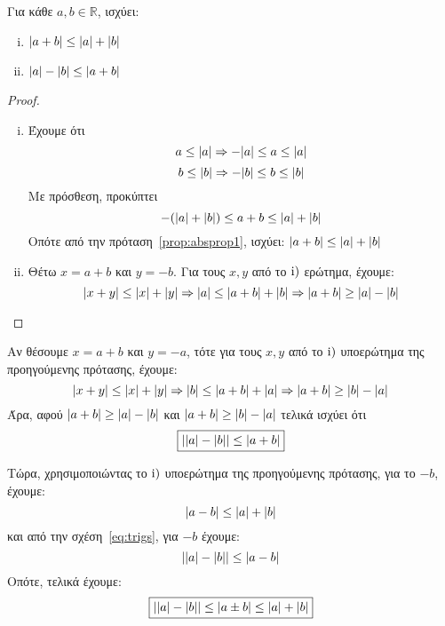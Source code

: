 \documentclass[main.tex]{subfiles}
\begin{document}
\begin{mypropbox}
  \label{prop:trigineq}
Για κάθε $ a, b \in \mathbb{R} $, ισχύει:
  \begin{enumerate}[(i)]
    \item $ \abs{a+b} \leq \abs{a} + \abs{b}   $
    \item $ \abs{a} - \abs{b} \leq \abs{a+b}  $
\end{enumerate}
\end{mypropbox}
\begin{proof}
\item {}
  \begin{enumerate}[(i)]
    \item Έχουμε ότι 
      \[ 
        a \leq \abs{a} \Rightarrow - \abs{a} \leq a \leq \abs{a}
      \] 
      \[
        b \leq \abs{b} \Rightarrow - \abs{b} \leq b \leq \abs{b} 
      \] 
      Με πρόσθεση, προκύπτει
      \[
        - (\abs{a} + \abs{b} ) \leq a + b \leq \abs{a} + \abs{b} 
      \] 
      Οπότε από την πρόταση~\ref{prop:absprop1}, ισχύει:
      $ \abs{a+b} \leq \abs{a} + \abs{b} $
    \item Θέτω $ x = a+b $ και $ y = -b $. Για τους $ x,y $ από το $ \rm{i}) $ 
      ερώτημα, έχουμε:
      \[
        \abs{x+y} \leq \abs{x} + \abs{y} \Rightarrow \abs{a} \leq 
        \abs{a+b} + \abs{b} \Rightarrow \abs{a+b} \geq \abs{a} - \abs{b}
      \] 
  \end{enumerate} 
\end{proof} 

\begin{rem}
  Αν θέσουμε $ x = a+b $ και $ y = -a $, τότε για τους $ x,y $ από το $ \rm{i)} $ 
  υποερώτημα της προηγούμενης πρότασης, έχουμε:
  \[
    \abs{x+y} \leq \abs{x} + \abs{y} \Rightarrow \abs{b} \leq 
    \abs{a+b} + \abs{a} \Rightarrow \abs{a+b} \geq \abs{b} - \abs{a} 
  \] 
  Άρα, αφού $ \abs{a+b} \geq \abs{a} - \abs{b} $ και 
  $ \abs{a+b} \geq \abs{b} - \abs{a} $ τελικά ισχύει ότι
  \begin{equation}\label{eq:trigs} 
    \boxed{\abs{\abs{a} - \abs{b}} \leq \abs{a+b}}
  \end{equation}

  Τώρα, χρησιμοποιώντας το $ \rm{i)} $ υποερώτημα της προηγούμενης πρότασης, για το 
  $ -b $, έχουμε:
  \[
    \abs{a-b} \leq \abs{a} + \abs{b} 
  \] 
  και από την σχέση~\eqref{eq:trigs}, για $-b$ έχουμε:
  \[
    \abs{\abs{a} - \abs{b}} \leq \abs{a-b} 
  \]
  Οπότε, τελικά έχουμε:
  \[
    \boxed{\abs{\abs{a} - \abs{b}} \leq \abs{a \pm b} \leq \abs{a} + \abs{b}  }
  \]
\end{rem}
\end{document}
